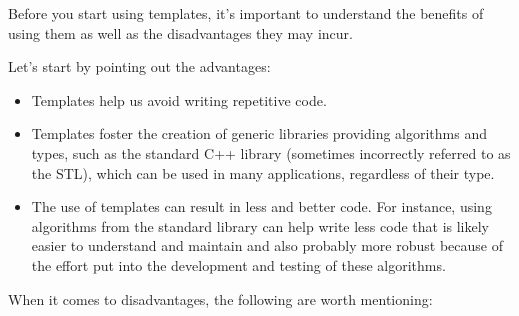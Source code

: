 
Before you start using templates, it's important to understand the benefits of using them as well as the disadvantages they may incur.

Let's start by pointing out the advantages:

\begin{itemize}
\item
Templates help us avoid writing repetitive code.

\item
Templates foster the creation of generic libraries providing algorithms and types, such as the standard C++ library (sometimes incorrectly referred to as the STL), which can be used in many applications, regardless of their type.

\item
The use of templates can result in less and better code. For instance, using algorithms from the standard library can help write less code that is likely easier to understand and maintain and also probably more robust because of the effort put into the development and testing of these algorithms.
\end{itemize}

When it comes to disadvantages, the following are worth mentioning:

